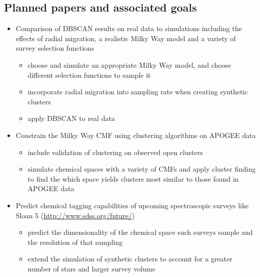 \documentclass[11pt]{article}
\begin{document}
\subsection*{Planned papers and associated goals}
\begin{itemize}
	\item Comparison of DBSCAN results on real data to simulations including the effects of radial migration, a realistic Milky Way model and a variety of survey selection functions
	\begin{itemize}
	\item choose and simulate an appropriate Milky Way model, and choose different selection functions to sample it
	\item incorporate radial migration into sampling rate when creating synthetic clusters
	\item apply DBSCAN to real data
	\end{itemize}
	\item Constrain the Milky Way CMF using clustering algorithms on APOGEE data
	\begin{itemize}
	\item include validation of clustering on observed open clusters
	\item simulate chemical spaces with a variety of CMFs and apply cluster finding to find the which space yields clusters most similar to those found in APOGEE data
	\end{itemize}
	\item Predict chemical tagging capabilities of upcoming spectroscopic surveys like Sloan 5 (\url{http://www.sdss.org/future/})
	\begin{itemize}
	\item predict the dimensionality of the chemical space such surveys sample and the resolution of that sampling
	\item extend the simulation of synthetic clusters to account for a greater number of stars and larger survey volume
	\end{itemize}
\end{itemize}

\end{document}
